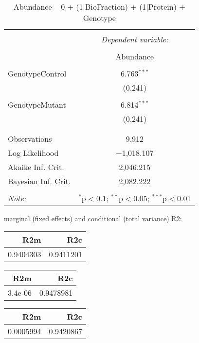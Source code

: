 \documentclass[11pt]{report}
\begin{document}
\begin{table}[!htbp] \centering 
  \caption{Abundance ~ 0 + (1|BioFraction) + (1|Protein) + Genotype} 
  \label{} 
\begin{tabular}{@{\extracolsep{5pt}}lc} 
\\[-1.8ex]\hline 
\hline \\[-1.8ex] 
 & \multicolumn{1}{c}{\textit{Dependent variable:}} \\ 
\cline{2-2} 
\\[-1.8ex] & Abundance \\ 
\hline \\[-1.8ex] 
 GenotypeControl & 6.763$^{***}$ \\ 
  & (0.241) \\ 
  & \\ 
 GenotypeMutant & 6.814$^{***}$ \\ 
  & (0.241) \\ 
  & \\ 
\hline \\[-1.8ex] 
Observations & 9,912 \\ 
Log Likelihood & $-$1,018.107 \\ 
Akaike Inf. Crit. & 2,046.215 \\ 
Bayesian Inf. Crit. & 2,082.222 \\ 
\hline 
\hline \\[-1.8ex] 
\textit{Note:}  & \multicolumn{1}{r}{$^{*}$p$<$0.1; $^{**}$p$<$0.05; $^{***}$p$<$0.01} \\ 
\end{tabular} 
\end{table} 
marginal (fixed effects) and conditional (total variance) R2:

\begin{tabular}{r|r}
\hline
R2m & R2c\\
\hline
0.9404303 & 0.9411201\\
\hline
\end{tabular}

\begin{tabular}{r|r}
\hline
R2m & R2c\\
\hline
3.4e-06 & 0.9478981\\
\hline
\end{tabular}

\begin{tabular}{r|r}
\hline
R2m & R2c\\
\hline
0.0005994 & 0.9420867\\
\hline
\end{tabular}
\end{document}
